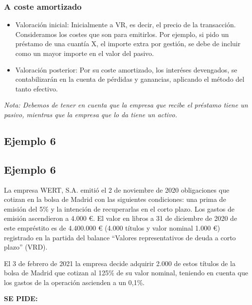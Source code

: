 \subsubsection{A coste amortizado}
\begin{itemize}
    \item Valoración inicial: Inicialmente a VR, es decir, el precio de la transacción. Consideramos los costes que son para emitirlos. Por ejemplo, si pido un préstamo de una cuantía X, el importe extra por gestión, se debe de incluir como un mayor importe en el valor del pasivo.
    \item Valoración posterior: Por su coste amortizado, los interéses devengados, se contabilizarán en la cuenta de pérdidas y ganancias, aplicando el método del tanto efectivo.
\end{itemize}

\textit{Nota: Debemos de tener en cuenta que la empresa que recibe el préstamo tiene un pasivo, mientras que la empresa que lo da tiene un activo.}







\subsection*{Ejemplo 6}

\subsection{Ejemplo 6}

La empresa WERT, S.A. emitió el 2 de noviembre de 2020 obligaciones que cotizan en la bolsa de Madrid con las siguientes condiciones: una prima de emisión del 5\% y la intención de recuperarlas en el corto plazo. Los gastos de emisión ascendieron a 4.000 €. El valor en libros a 31 de diciembre de 2020 de este empréstito es de 4.400.000 € (4.000 títulos y valor nominal 1.000 €) registrado en la partida del balance “Valores representativos de deuda a corto plazo” (VRD).

El 3 de febrero de 2021 la empresa decide adquirir 2.000 de estos títulos de la bolsa de Madrid que cotizan al 125\% de su valor nominal, teniendo en cuenta que los gastos de la operación ascienden a un 0,1\%.

\textbf{SE PIDE:}

